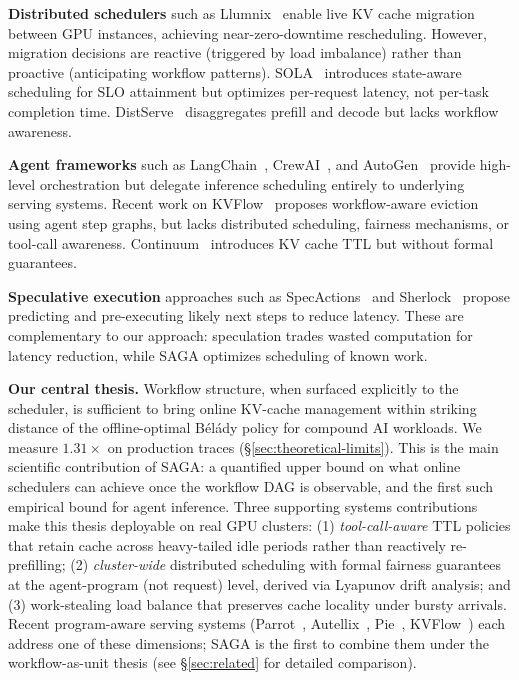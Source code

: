 \documentclass[sigconf]{acmart}
\newcommand{\sysname}{SAGA\xspace}
\begin{document}
\textbf{Distributed schedulers} such as Llumnix~\cite{sun2024llumnix} enable live KV cache migration between GPU instances, achieving near-zero-downtime rescheduling. However, migration decisions are reactive (triggered by load imbalance) rather than proactive (anticipating workflow patterns). SOLA~\cite{chen2025sola} introduces state-aware scheduling for SLO attainment but optimizes per-request latency, not per-task completion time. DistServe~\cite{zhong2024distserve} disaggregates prefill and decode but lacks workflow awareness.

\textbf{Agent frameworks} such as LangChain~\cite{langchain2024}, CrewAI~\cite{crewai2023}, and AutoGen~\cite{wu2024autogen} provide high-level orchestration but delegate inference scheduling entirely to underlying serving systems. Recent work on KVFlow~\cite{kvflow2025} proposes workflow-aware eviction using agent step graphs, but lacks distributed scheduling, fairness mechanisms, or tool-call awareness. Continuum~\cite{continuum2024} introduces KV cache TTL but without formal guarantees.

\textbf{Speculative execution} approaches such as SpecActions~\cite{specactions2026} and Sherlock~\cite{sherlock2024} propose predicting and pre-executing likely next steps to reduce latency. These are complementary to our approach: speculation trades wasted computation for latency reduction, while \sysname optimizes scheduling of known work.

\textbf{Our central thesis.} Workflow structure, when surfaced explicitly to the scheduler, is sufficient to bring online KV-cache management within striking distance of the offline-optimal B\'{e}l\'{a}dy policy for compound AI workloads. We measure $1.31\times$ on production traces (\S\ref{sec:theoretical-limits}). This is the main scientific contribution of \sysname: a quantified upper bound on what online schedulers can achieve once the workflow DAG is observable, and the first such empirical bound for agent inference. Three supporting systems contributions make this thesis deployable on real GPU clusters: (1) \emph{tool-call-aware} TTL policies that retain cache across heavy-tailed idle periods rather than reactively re-prefilling; (2) \emph{cluster-wide} distributed scheduling with formal fairness guarantees at the agent-program (not request) level, derived via Lyapunov drift analysis; and (3) work-stealing load balance that preserves cache locality under bursty arrivals. Recent program-aware serving systems (Parrot~\cite{lin2024parrot}, Autellix~\cite{luo2025autellix}, Pie~\cite{gim2025pie}, KVFlow~\cite{kvflow2025}) each address one of these dimensions; \sysname is the first to combine them under the workflow-as-unit thesis (see \S\ref{sec:related} for detailed comparison).
\end{document}
